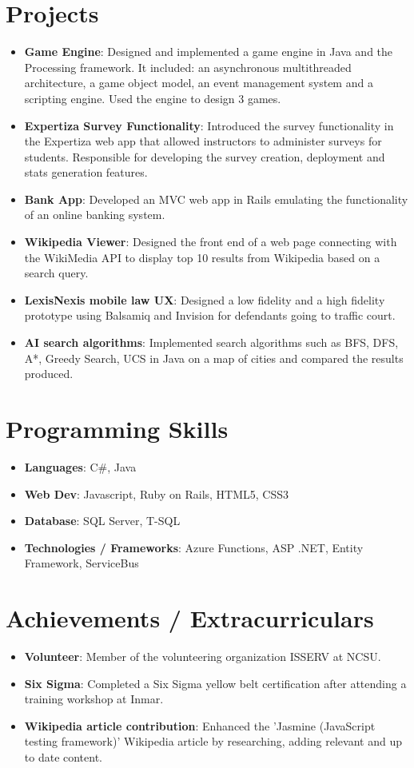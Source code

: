 \documentclass[letterpaper,11pt]{article}
\newcommand{\resumeItem}[2]{
  \item\small{
    \textbf{#1}{: #2 \vspace{-2pt}}
  }
}
\newcommand{\resumeSubItem}[2]{\resumeItem{#1}{#2}\vspace{-4pt}}
\newcommand{\resumeSubHeadingListStart}{\begin{itemize}[leftmargin=*]}
\newcommand{\resumeSubHeadingListEnd}{\end{itemize}}
\begin{document}

\section{Projects}
  \resumeSubHeadingListStart
    \resumeSubItem{Game Engine}
      {Designed and implemented a game engine in Java and the Processing framework. It included: an asynchronous multithreaded architecture, a game object model, an event management system and a scripting engine. Used the engine to design 3 games.}
    \resumeSubItem{Expertiza Survey Functionality}
      {Introduced the survey functionality in the Expertiza web app that allowed instructors to administer surveys for students. Responsible for developing the survey creation, deployment and stats generation features.}
    \resumeSubItem{Bank App}
      {Developed an MVC web app in Rails emulating the functionality of an online banking system.}
    \resumeSubItem{Wikipedia Viewer}
      {Designed the front end of a web page connecting with the WikiMedia API to display top 10 results from Wikipedia based on a search query.}
    \resumeSubItem{LexisNexis mobile law UX}
      {Designed a low fidelity and a high fidelity prototype using Balsamiq and Invision for defendants going to traffic court.}
      \resumeSubItem{AI search algorithms}
      {Implemented search algorithms such as BFS, DFS, A*, Greedy Search, UCS in Java on a map of cities and compared the results produced.}
  \resumeSubHeadingListEnd


\section{Programming Skills}
  \resumeSubHeadingListStart
    \resumeSubItem{Languages}{C\#, Java}
    \resumeSubItem{Web Dev}{Javascript, Ruby on Rails, HTML5, CSS3}
    \resumeSubItem{Database}{SQL Server, T-SQL}    
    \resumeSubItem{Technologies / Frameworks}{Azure Functions, ASP .NET, Entity Framework, ServiceBus}
  \resumeSubHeadingListEnd


\section{Achievements / Extracurriculars}
  \resumeSubHeadingListStart
    \resumeSubItem{Volunteer}
      {Member of the volunteering organization ISSERV at NCSU.}
    \resumeSubItem{Six Sigma}
      {Completed a Six Sigma yellow belt certification after attending a training workshop at Inmar.}
    \resumeSubItem{Wikipedia article contribution}
      {Enhanced the 'Jasmine (JavaScript testing framework)' Wikipedia article by researching, adding relevant and up to date content.}
  \resumeSubHeadingListEnd

\end{document}
